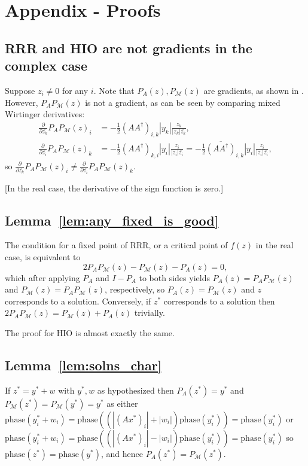 \documentclass[journal]{IEEEtran}
\theoremstyle{definition}
\theoremstyle{remark}
\theoremstyle{definition}
\theoremstyle{problem}
\theoremstyle{definition}
\newcommand{\phase}{\text{phase}}
\newcommand{\MM}{\mathcal{M}}
\begin{document}



\appendix
\section{Appendix - Proofs}

\subsection{RRR and HIO are not gradients in the complex case}\label{sec:complex_not_grads}
Suppose $z_i\neq 0$ for any $i$. Note that $P_A(z),P_{\MM}(z)$ are gradients, as shown in \cite{Marchesini2007}. However, $P_AP_{\MM}(z)$ is not a gradient, as can be seen by comparing mixed Wirtinger derivatives:
\[\begin{aligned} \frac{\partial}{\partial \overline{z_k}}P_AP_{\MM}(z)_i &= -\frac{1}{2}(AA^{\dagger})_{i,k}|y_k|\frac{z_k}{|z_k|\overline{z_k}},\\
\frac{\partial}{\partial \overline{z_i}}P_AP_{\MM}(z)_k &= -\frac{1}{2}(AA^{\dagger})_{k,i}|y_i|\frac{z_i}{|z_i|\overline{z_i}} = -\frac{1}{2}\overline{(AA^{\dagger})}_{i,k}|y_i|\frac{z_i}{|z_i|\overline{z_i}},\end{aligned}\]
so $\frac{\partial}{\partial \overline{z_k}}P_AP_{\MM}(z)_i\neq \frac{\partial}{\partial \overline{z_i}}P_AP_{\MM}(z)_k$. 

[In the real case, the derivative of the sign function is zero.]

\subsection{Lemma~\ref{lem:any_fixed_is_good}}\label{sec:pf_any_fixed_good}
The condition for a fixed point of RRR, or a critical point of $f(z)$ in the real case, is equivalent to
\[ 2P_AP_{\MM}(z) - P_{\MM}(z) - P_A(z) = 0,\]
which after applying $P_A$ and $I-P_A$ to both sides yields $P_A(z) = P_AP_{\MM}(z)$ and $P_{\MM}(z) = P_AP_{\MM}(z)$, respectively, so $P_A(z)=P_{\MM}(z)$ and $z$ corresponds to a solution. Conversely, if $z^*$ corresponds to a solution then $2P_AP_{\MM}(z) = P_{\MM}(z) + P_A(z)$ trivially.

The proof for HIO is almost exactly the same.

\subsection{Lemma~\ref{lem:solns_char}}\label{sec:pf_solns_char}
If $z^* = y^*+w$ with $y^*,w$ as hypothesized then $P_A(z^*)=y^*$ and $P_{\MM}(z^*) = P_{\MM}(y^*)=y^*$ as either $\phase(y^*_i+w_i) = \phase((|(Ax^*)_i|+|w_i|)\phase(y^*_i))=\phase(y^*_i)$ or $\phase(y^*_i+w_i) = \phase((|(Ax^*)_i|-|w_i|)\phase(y^*_i))=\phase(y^*_i)$ so $\phase(z^*)=\phase(y^*)$, and hence $P_A(z^*)=P_{\MM}(z^*)$.
\end{document}
